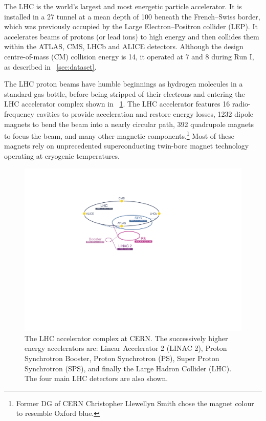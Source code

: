 
The LHC is the world's largest and most energetic particle accelerator. It is 
installed in a \unit{27}{\kilo\metre} tunnel at a mean depth of \unit{100}{\metre} beneath 
the French--Swiss border, which was previously occupied by the Large Electron--Positron 
collider (LEP). It accelerates beams of protons (or lead ions) to high energy and then 
collides them within the ATLAS, CMS, LHCb and ALICE detectors. Although the design 
centre-of-mass (CM) collision energy is \unit{14}{\TeV}, it operated at \unit{7}{\TeV} and 
\unit{8}{\TeV} during Run I, as described in \Section~\ref{sec:dataset}.

The LHC proton beams have humble beginnings as hydrogen molecules in a standard gas 
bottle, before being stripped of their electrons and entering the LHC accelerator 
complex shown in \Figure~\ref{fig:lhc}. The LHC accelerator features 16 
radio-frequency cavities to provide acceleration and restore energy losses, 1232 
dipole magnets to bend the beam into a nearly circular path, 392 quadrupole magnets to 
focus the beam, and many other magnetic components.\footnote{
	Former DG of CERN Christopher Llewellyn Smith chose the magnet colour to resemble Oxford blue.
}
Most of these magnets rely on unprecedented superconducting twin-bore magnet technology 
operating at cryogenic temperatures.

\begin{figure}
	\includegraphics[width=\largefigwidth,clip=true,trim=9.7cm 13.4cm 13.4cm 4.7cm]{custom_images/accelerators}
	\caption{The LHC accelerator complex at CERN. The successively higher energy 
	accelerators are: Linear Accelerator 2 (LINAC 2), Proton Synchrotron Booster, Proton 
	Synchrotron (PS), Super Proton Synchrotron (SPS), and finally the Large Hadron 
	Collider (LHC). The four main LHC detectors are also shown.}
	\label{fig:lhc}
\end{figure}

